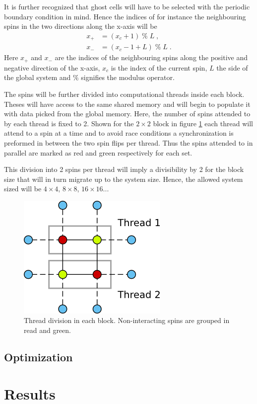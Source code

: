 \documentclass[paper=a4, fontsize=11pt]{scrartcl} %
\numberwithin{equation}{section} %
\numberwithin{figure}{section} %
\numberwithin{table}{section} %
\begin{document}
It is further recognized that ghost cells will have to be selected with the periodic boundary condition in mind. Hence the indices of for instance the neighbouring spins in the two directions along the x-axis will be
\begin{align*}
x_+&=(x_c+1)\; \% \; L \;, \\
x_-&=(x_c-1+L) \; \% \; L \;.
\end{align*}
Here $x_+$ and $x_-$ are the indices of the neighbouring spins along the positive and negative direction of the x-axis, $x_c$ is the index of the current spin, $L$ the side of the global system and $\%$ signifies the modulus operator.

The spins will be further divided into computational threads inside each block. Theses will have access to the same shared memory and will begin to populate it with data picked from the global memory. Here, the number of spins attended to by each thread is fixed to 2. Shown for the $2\times2$ block in figure \ref{fig:2D_threads} each thread will attend to a spin at a time and to avoid race conditions a synchronization is preformed in between the two spin flips per thread. Thus the spins attended to in parallel are marked as red and green respectively for each set.
 
This division into 2 spins per thread will imply a divisibility by 2 for the block size that will in turn migrate up to the system size. Hence, the allowed system sized will be $4\times4$, $8\times8$, $16\times16$...

\begin{figure}
\centering
\includegraphics[width=.4\linewidth]{images/2D_threads.png}
\caption{Thread division in each block. Non-interacting spins are grouped in read and green.}
\label{fig:2D_threads}
\end{figure}

\subsection{Optimization}

\section{Results}
\label{sec:results}
\end{document}
